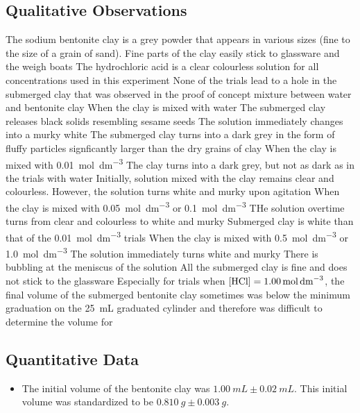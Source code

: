 \documentclass[11pt, letterpaper]{article}
\begin{document}
\subsection{Qualitative Observations}
\begin{outline}
    \1 The sodium bentonite clay is a grey powder that appears in various sizes (fine to the size of a grain of sand). Fine parts of the clay easily stick to glassware and the weigh boats
    \1 The hydrochloric acid is a clear colourless solution for all \ce{[H+]} concentrations used in this experiment
    \1 None of the trials lead to a hole in the submerged clay that was observed in the proof of concept mixture between water and bentonite clay
    \1 When the clay is mixed with water
    \2 The submerged clay releases black solids resembling sesame seeds
    \2 The solution immediately changes into a murky white
    \2 The submerged clay turns into a dark grey in the form of fluffy particles signficantly larger than the dry grains of clay
    \1 When the clay is mixed with \SI{0.01}{mol.dm^{-3}} 
    \2 The clay turns into a dark grey, but not as dark as in the trials with water
    \2 Initially, solution mixed with the clay remains clear and colourless. However, the solution turns white and murky upon agitation
    \1 When the clay is mixed with \SI{0.05}{mol.dm^{-3}}  or \SI{0.1}{mol.dm^{-3}} 
    \2 THe solution overtime turns from clear and colourless to white and murky
    \2 Submerged clay is white than that of the \SI{0.01}{mol.dm^{-3}} trials
    \1 When the clay is mixed with \SI{0.5}{mol.dm^{-3}}  or \SI{1.0}{mol.dm^{-3}} 
    \2 The solution immediately turns white and murky
    \2 There is bubbling at the meniscus of the solution
    \2 All the submerged clay is fine and does not stick to the glassware
    \1 Especially for trials when \(\ce{[HCl]} = \SI{1.00}{mol.dm^{-3}}\), the final volume of the submerged bentonite clay sometimes was below the minimum graduation on the \SI{25}{mL} graduated cylinder and therefore was difficult to determine the volume for
\end{outline}

\subsection{Quantitative Data}

\begin{itemize}
    \item The initial volume of the bentonite clay was \(\SI{1.00}{mL} \pm \SI{0.02}{mL}\). This initial volume was standardized to be \(\SI{0.810}{g} \pm \SI{0.003}{g}\).
\end{itemize}
\end{document}
